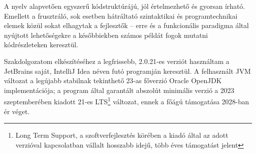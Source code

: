 A nyelv alapvetően egyszerű kódstruktúrájú, jól értelmezhető és gyorsan írható. Emellett a frusztráló, sok esetben hátráltató szintaktikai és programtechnikai elemek közül sokat elhagytak a fejlesztők -- erre és a funkcionális paradigma által nyújtott lehetőségekre a későbbiekben számos példát fogok mutatni kódrészleteken keresztül.

Szakdolgozatom elkészítéséhez a legfrissebb, 2.0.21-es verziót használtam a JetBrains saját, IntelliJ Idea néven futó programján keresztül. A felhasznált JVM változat a legújabb stabilnak tekinthető 23-as főverzió Oracle OpenJDK implementációja; a program által garantált abszolút minimális verzió a 2023 szeptemberében kiadott 21-es LTS\footnote{Long Term Support, a szoftverfejlesztés körében a kiadó által az adott verzióval kapcsolatban vállalt hosszabb idejű, több éves támogatást jelent} változat, ennek a főágú támogatása 2028-ban ér véget.~\cite{JavaRoadmap}